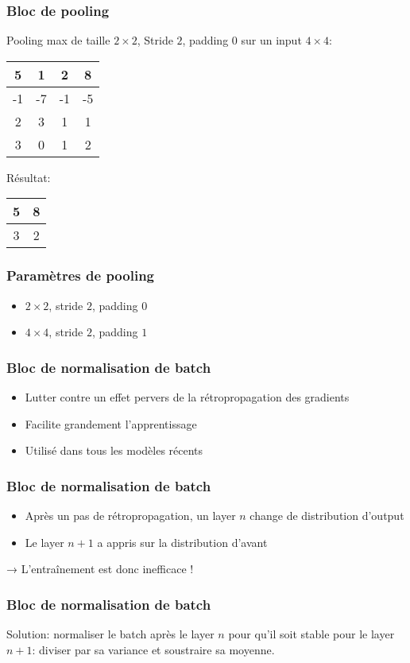 \documentclass{formation}
\begin{document}
\begin{frame}
  \frametitle{Bloc de pooling}
  Pooling max de taille $2\times 2$, Stride $2$, padding $0$ sur un input $4 \times
  4$:
  \\[.5cm]
  \begin{tabular}{|c|c|c|c|}
    \hline
    5 & 1 & 2 & 8 \\
    \hline
    -1 & -7 & -1 & -5 \\
    \hline
    2 & 3 & \cellcolor{green}1 & \cellcolor{green}1 \\
    \hline
    3 & 0 & \cellcolor{green}1 & \cellcolor{green}2 \\
    \hline
  \end{tabular}

  Résultat:
  \begin{tabular}{|c|c|}
    \hline
    5 & 8 \\
    \hline
    3 & \cellcolor{green}2 \\
    \hline
  \end{tabular}
\end{frame}

\begin{frame}
  \frametitle{Paramètres de pooling}
  \begin{itemize}
  \item $2 \times 2$, stride $2$, padding $0$
  \item $4 \times 4$, stride $2$, padding $1$
  \end{itemize}
\end{frame}

\begin{frame}
  \frametitle{Bloc de normalisation de batch}
  \begin{itemize}
  \item Lutter contre un effet pervers de la rétropropagation des
    gradients~\cite{Ioffe2015}
  \item Facilite grandement l'apprentissage
  \item Utilisé dans tous les modèles récents
  \end{itemize}
\end{frame}

\begin{frame}
  \frametitle{Bloc de normalisation de batch}
  \begin{itemize}
  \item Après un pas de rétropropagation, un layer $n$ change de
    distribution d'output
  \item Le layer $n+1$ a appris sur la distribution d'avant
  \end{itemize}
  → L'entraînement est donc inefficace !
\end{frame}
\begin{frame}
  \frametitle{Bloc de normalisation de batch}
  Solution: normaliser le batch après le layer $n$ pour qu'il soit
  stable pour le layer $n+1$: diviser par sa variance et soustraire sa
  moyenne.
\end{frame}
\end{document}
